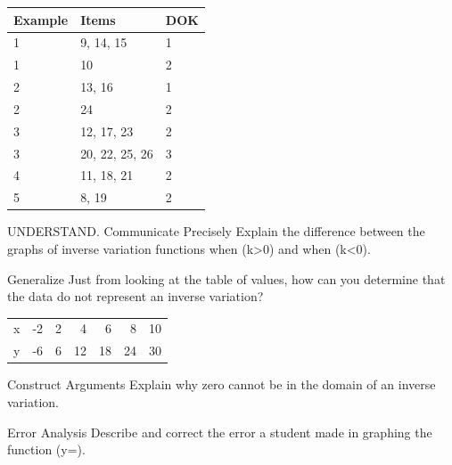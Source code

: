 \documentclass{article}
\newenvironment{item-analysis}{}{}      %
\newenvironment{practice}[2]{}{}        %
\newcommand{\answer}[1]{}               %
\newcommand{\placeholder}[2]{}          %
\newcommand{\te}[1]{}                   %
\begin{document}
\begin{item-analysis}
\begin{tabular}{lll}
\toprule
Example & Items & DOK \\
\midrule
1 & 9, 14, 15 & 1 \\
1 & 10 & 2 \\
2 & 13, 16 & 1 \\
2 & 24 & 2 \\
3 & 12, 17, 23 & 2 \\
3 & 20, 22, 25, 26 & 3 \\
4 & 11, 18, 21 & 2 \\
5 & 8, 19 & 2 \\
\bottomrule
\end{tabular}
\end{item-analysis}
\begin{practice}{8}{2}
UNDERSTAND. Communicate Precisely Explain the difference between the graphs of inverse variation functions when (k>0) and when (k<0).
\answer{When (k>0), the graph lies in Quadrants I and III; when (k<0), the graph lies in Quadrants II and IV.}
\end{practice}
\begin{practice}{9}{1}
Generalize Just from looking at the table of values, how can you determine that the data do not represent an inverse variation?
\begin{tabular}{lrrrrrr}
x & -2 & 2 & 4 & 6 & 8 & 10 \\
y & -6 & 6 & 12 & 18 & 24 & 30 \\
\end{tabular}
\answer{As the (x)-values increase, the (y)-values also increase.}
\te{Printed answer alone is not a general test for inverse variation with negative constant; here the products differ.}
\end{practice}
\begin{practice}{10}{2}
Construct Arguments Explain why zero cannot be in the domain of an inverse variation.
\answer{Division by zero is undefined.}
\end{practice}
\begin{practice}{11}{2}
Error Analysis Describe and correct the error a student made in graphing the function (y=).
\placeholder{graph}{Student graph on blue grid, axes x,y,O, window -6 to6 both grid1 labels -4,-2,2,4. Red reciprocal curve with six solid points labeled (1,5),(2,4),(5,1),(-5,-1),(-2,-4),(-1,-5). The points at x=2,-2 are drawn near y=2.5,-2.5 but mislabeled; red X lower right; arrowheads on curve.}
\answer{The points (2,4) and (-2,-4) are not correct. The labels of these points should be (2,2.5) and (-2,-2.5).}
\end{practice}
\end{document}
